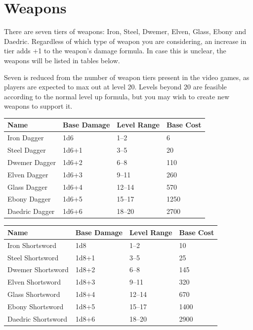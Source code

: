 \documentclass[12pt]{book}
\begin{document}
\section{Weapons}
There are seven tiers of weapons: Iron, Steel, Dwemer, Elven, Glass, Ebony and Daedric. Regardless of which type of weapon you are considering, an increase in tier adds +1 to the weapon's damage formula. In case this is unclear, the weapons will be listed in tables below.

Seven is reduced from the number of weapon tiers present in the video games, as players are expected to max out at level 20. Levels beyond 20 are feasible according to the normal level up formula, but you may wish to create new weapons to support it.

\begin{tabular}{|p{}|p{}|p{}|p{}|}
\hline
Name & Base Damage & Level Range & Base Cost\\ \hline
Iron Dagger & 1d6 & 1--2 & 6\\ \hline
Steel Dagger & 1d6+1 & 3--5 & 20\\ \hline
Dwemer Dagger & 1d6+2 & 6--8 & 110\\ \hline
Elven Dagger & 1d6+3 & 9--11 & 260\\ \hline
Glass Dagger & 1d6+4 & 12--14 & 570\\ \hline
Ebony Dagger & 1d6+5 & 15--17 & 1250\\ \hline
Daedric Dagger & 1d6+6 & 18--20 & 2700\\ \hline
\end{tabular}

\begin{tabular}{|p{}|p{}|p{}|p{}|}
\hline
Name & Base Damage & Level Range & Base Cost\\ \hline
Iron Shortsword & 1d8 & 1--2 & 10\\ \hline
Steel Shortsword & 1d8+1 & 3--5 & 25\\ \hline
Dwemer Shortsword & 1d8+2 & 6--8 & 145\\ \hline
Elven Shortsword & 1d8+3 & 9--11 & 320\\ \hline
Glass Shortsword & 1d8+4 & 12--14 & 670\\ \hline
Ebony Shortsword & 1d8+5 & 15--17 & 1400\\ \hline
Daedric Shortsword & 1d8+6 & 18--20 & 2900\\ \hline
\end{tabular}
\end{document}

